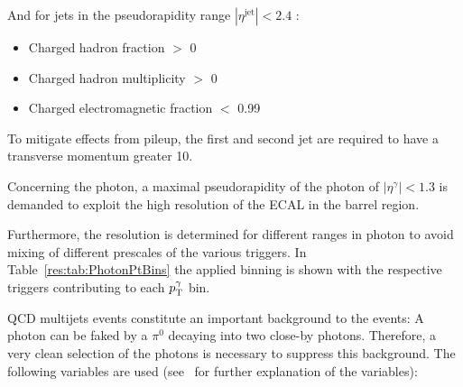  And for jets in the pseudorapidity range $|\eta^{\text{jet}}| < 2.4 $ :
\begin{itemize}
 \item Charged hadron fraction $>$ 0
 \item Charged hadron multiplicity $>$ 0
 \item Charged electromagnetic fraction $<$ 0.99
\end{itemize}
To mitigate effects from pileup, the first and second jet are required to have a transverse momentum greater 10\gev.

Concerning the photon, a maximal pseudorapidity of the photon of $|\eta^{\gamma}| < 1.3$ is demanded to exploit the high resolution of the ECAL in the barrel region.

Furthermore, the resolution is determined for different ranges in photon \pt to avoid mixing of different prescales of the various triggers. 
In Table~\ref{res:tab:PhotonPtBins} the applied binning is shown with the respective triggers contributing to each $p_{\text{T}}^{\gamma}$ bin.


\renewcommand{\arraystretch}{1.5}
\begin{table}[htb]
\centering
\caption{Photon \pt bins and corresponding triggers.}
\label{res:tab:PhotonPtBins}
\end{table}

QCD multijets events constitute an important background to the \GAMJET events: A photon can be faked by a $\pi^{0}$ decaying into two close-by photons. 
Therefore, a very clean selection of the photons is necessary to suppress this background.
The following variables are used (see~\cite{CMS-PAS-EGM-10-006} for further explanation of the variables):


